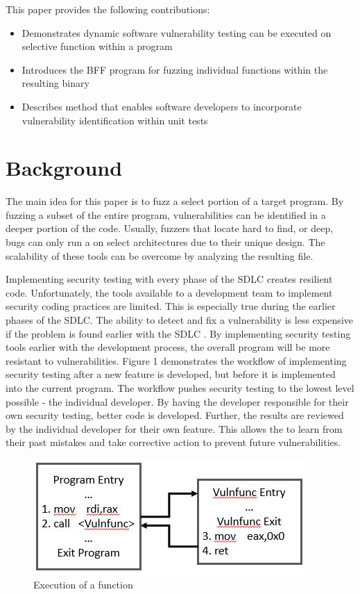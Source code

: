 \documentclass[conference]{IEEEtran}
\begin{document}
This paper provides the following contributions:
\begin{itemize}
\item Demonstrates dynamic software vulnerability testing can be executed on selective function within a program
\item Introduces the BFF program for fuzzing individual functions within the resulting binary
\item Describes method that enables software developers to incorporate vulnerability identification within unit tests
\end{itemize}

\section{Background}
The main idea for this paper is to fuzz a select portion of a target program. By fuzzing a subset of the entire program, vulnerabilities can be identified in a deeper portion of the code. Usually, fuzzers that locate hard to find, or deep, bugs can only run a on select architectures due to their unique design. The scalability of these tools can be overcome by analyzing the resulting file. 

Implementing security testing with every phase of the SDLC creates resilient code. Unfortunately, the tools available to a development team to implement security coding practices are limited. This is especially true during the earlier phases of the SDLC. The ability to detect and fix a vulnerability is less expensive if the problem is found earlier with the SDLC \cite{tuteja_research_2012}. By implementing security testing tools earlier with the development process, the overall program will be more resistant to vulnerabilities. Figure 1 demonstrates the workflow of implementing security testing after a new feature is developed, but before it is implemented into the current program. The workflow pushes security testing to the lowest level possible - the individual developer. By having the developer responsible for their own security testing, better code is developed. Further, the results are reviewed by the individual developer for their own feature. This allows the to learn from their past mistakes and take corrective action to prevent future vulnerabilities. 

\begin{figure}
  \includegraphics[width=\linewidth]{Program_flow.JPG}
  \caption{Execution of a function}
  \label{fig:Program_Flow}
\end{figure}
\end{document}

